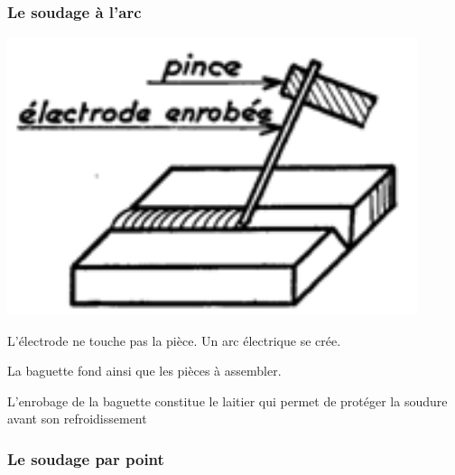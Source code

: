 \documentclass[11pt,oneside]{article}
\begin{document}
\subsubsection{Le soudage à l'arc}
\begin{minipage}[c]{.3\linewidth}
\begin{center}
\includegraphics[width=0.9\textwidth]{png/arc}
\end{center}
\end{minipage}\hfill
\begin{minipage}[c]{.65\linewidth}

L'électrode ne touche pas la pièce. Un arc électrique se crée.

La baguette fond ainsi que les pièces à assembler.

L'enrobage de la baguette constitue le laitier qui permet de protéger la soudure avant son refroidissement 

\end{minipage}


\subsubsection{Le soudage par point}
\end{document}
